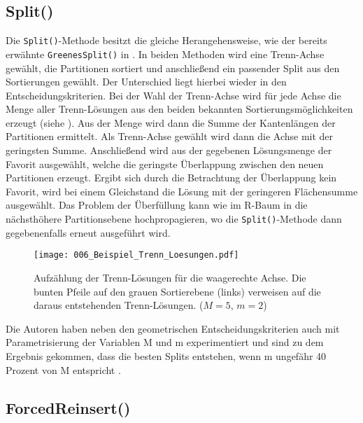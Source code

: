 \documentclass[runningheads,a4paper]{llncs}
\begin{document}
	\subsection{Split()}
	Die \texttt{Split()}-Methode besitzt die gleiche Herangehensweise, wie der bereits erwähnte \texttt{GreenesSplit()} in . In beiden Methoden wird eine Trenn-Achse gewählt, die Partitionen sortiert und anschließend ein passender Split aus den Sortierungen gewählt. Der Unterschied liegt hierbei wieder in den Entscheidungskriterien. Bei der Wahl der Trenn-Achse wird für jede Achse die Menge aller Trenn-Lösungen aus den beiden bekannten Sortierungsmöglichkeiten erzeugt (siehe ). Aus der Menge wird dann die Summe der Kantenlängen der Partitionen ermittelt. Als Trenn-Achse gewählt wird dann die Achse mit der geringsten Summe.
	Anschließend wird aus der gegebenen Lösungsmenge der Favorit ausgewählt, welche die geringste Überlappung zwischen den neuen Partitionen erzeugt. Ergibt sich durch die Betrachtung der Überlappung kein Favorit, wird bei einem Gleichstand die Lösung mit der geringeren Flächensumme ausgewählt. Das Problem der Überfüllung kann wie im R-Baum in die nächsthöhere Partitionsebene hochpropagieren, wo die \texttt{Split()}-Methode dann gegebenenfalls erneut ausgeführt wird.

	\begin{figure}[h]
		\centering
		\texttt{[image: 006\_Beispiel\_Trenn\_Loesungen.pdf]}
		\caption{Aufzählung der Trenn-Lösungen für die waagerechte Achse. Die bunten Pfeile auf den grauen Sortierebene (links) verweisen auf die daraus entstehenden Trenn-Lösungen. ($M=5$, $m=2$)}
		\label{fig:beispiel-trenn-loesungen}
	\end{figure}

	Die Autoren haben neben den geometrischen Entscheidungskriterien auch mit Parametrisierung der Variablen \acs{M} und \acs{m} experimentiert und sind zu dem Ergebnis gekommen, dass die besten Splits entstehen, wenn \acs{m} ungefähr 40 Prozent von \acs{M} entspricht \citep[vgl.][328]{Beckmann:1990}.

	\subsection{ForcedReinsert()}
	\label{sec:rstar_reinsert}
\end{document}
